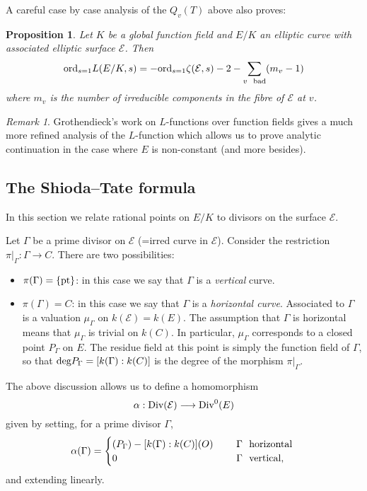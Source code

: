 \documentclass[12pt]{amsart}
\numberwithin{equation}{section}
\newtheorem{proposition}[equation]{Proposition}
\theoremstyle{remark}
\newtheorem{remark}[equation]{Remark}
\theoremstyle{definition}
\theoremstyle{definition}
\theoremstyle{definition}
\theoremstyle{definition}
\theoremstyle{definition}
\theoremstyle{definition}
\theoremstyle{definition}
\begin{document}
A careful case by case analysis of the $Q_v(T)$ above also proves:

\begin{proposition}
Let $K$ be a global function field and $E/K$ an elliptic curve with associated elliptic surface $\mathcal{E}$. Then
\[\textup{ord}_{s=1}L(E/K,s)=-\textup{ord}_{s=1}\zeta(\mathcal{E},s)-2-\sum_{v~\textup{ bad}}(m_v-1)\]
where $m_v$ is the number of irreducible components in the fibre of $\mathcal{E}$ at $v$.
\end{proposition}

\begin{remark}
Grothendieck's work \cite{MR1608788} on $L$-functions over function fields gives a much more refined analysis of the $L$-function which allows us to prove analytic continuation in the case where $E$ is non-constant (and more besides).
\end{remark}

\subsection{The Shioda--Tate formula}

In this section we relate rational points on $E/K$ to divisors on the surface $\mathcal{E}$. 

Let $\Gamma$ be a prime divisor on $\mathcal{E}$ (=irred curve in $\mathcal{E}$). Consider the restriction $\pi|_\Gamma:\Gamma \rightarrow C$. There are two possibilities:

\begin{itemize}
\item $\pi(\Gamma)=\{\textup{pt}\}$: in this case we say that $\Gamma$ is a \textit{vertical} curve.
\item $\pi(\Gamma)=C$: in this case we say that $\Gamma$ is a \textit{horizontal curve}. Associated to $\Gamma$ is a valuation $\mu_\Gamma$ on $k(\mathcal{E})=k(E)$. The assumption that $\Gamma$ is horizontal means that $\mu_\Gamma$ is trivial on $k(C)$. In particular, $\mu_\Gamma$ corresponds to a closed point $P_\Gamma$ on $E$. The residue field at this point is simply the function field of $\Gamma$, so that $\textup{deg}P_\Gamma=[k(\Gamma):k(C)]$ is the degree of the morphism $\pi|_\Gamma$.  
\end{itemize} 

The above discussion allows us to define a homomorphism
\[\alpha: \textup{Div}(\mathcal{E})\longrightarrow \textup{Div}^0(E)\]
given by setting, for a prime divisor $\Gamma$, 
\[\alpha(\Gamma)=\begin{cases}(P_\Gamma) - [k(\Gamma):k(C)](O) ~~&~~\Gamma ~\textup{ horizontal }\\ 0~~&~~\Gamma ~\textup{ vertical,} \end{cases}\] 
and extending linearly. 
\end{document}
